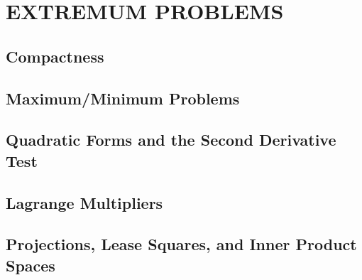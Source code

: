 \section{EXTREMUM PROBLEMS}
\subsection{Compactness}
\subsection{Maximum/Minimum Problems}
\subsection{Quadratic Forms and the Second Derivative Test}
\subsection{Lagrange Multipliers}
\subsection{Projections, Lease Squares, and Inner Product Spaces}
